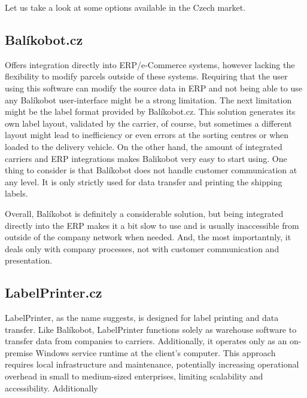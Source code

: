 Let us take a look at some options available in the Czech market.

\subsection{Balíkobot.cz}
\label{subsec:balikobot}
Offers integration directly into \ac{ERP}/e-Commerce systems, however lacking the flexibility to modify parcels outside of these systems.
Requiring that the user using this software can modify the source data in \ac{ERP} and not being able to use any Balíkobot user-interface might be a strong limitation.
The next limitation might be the label format provided by Balíkobot.cz.
This solution generates its own label layout, validated by the carrier, of course, but sometimes a different layout might lead to inefficiency or even errors at the sorting centres or when loaded to the delivery vehicle.
On the other hand, the amount of integrated carriers and \ac{ERP} integrations makes Balikobot very easy to start using.
One thing to consider is that Balíkobot does not handle customer communication at any level.
It is only strictly used for data transfer and printing the shipping labels.

Overall, Balíkobot is definitely a considerable solution, but being integrated directly into the \ac{ERP} makes it a bit slow to use and is usually inaccessible from outside of the company network when needed.
And, the most importantnly, it deals only with company processes, not with customer communication and presentation.

\subsection{LabelPrinter.cz}
\label{subsec:labelprinter}
LabelPrinter, as the name suggests, is designed for label printing and data transfer. Like Balíkobot, LabelPrinter functions solely as warehouse software to transfer data from companies to carriers.
Additionally, it operates only as an on-premise Windows service runtime at the client's computer.
This approach requires local infrastructure and maintenance, potentially increasing operational overhead in small to medium-sized enterprises, limiting scalability and accessibility.
Additionally 

